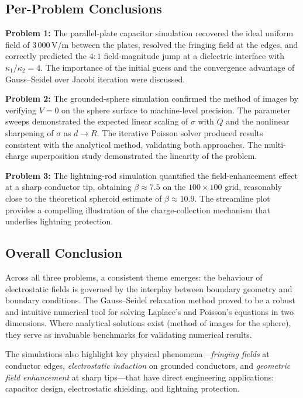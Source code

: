 \documentclass[11pt,a4paper]{article}
\begin{document}
\subsection{Per-Problem Conclusions}

\textbf{Problem 1:} The parallel-plate capacitor simulation recovered the ideal uniform field of 3\,000\,V/m between the plates, resolved the fringing field at the edges, and correctly predicted the $4{:}1$ field-magnitude jump at a dielectric interface with $\kappa_1/\kappa_2 = 4$. The importance of the initial guess and the convergence advantage of Gauss--Seidel over Jacobi iteration were discussed.

\textbf{Problem 2:} The grounded-sphere simulation confirmed the method of images by verifying $V=0$ on the sphere surface to machine-level precision. The parameter sweeps demonstrated the expected linear scaling of $\sigma$ with $Q$ and the nonlinear sharpening of $\sigma$ as $d \to R$. The iterative Poisson solver produced results consistent with the analytical method, validating both approaches. The multi-charge superposition study demonstrated the linearity of the problem.

\textbf{Problem 3:} The lightning-rod simulation quantified the field-enhancement effect at a sharp conductor tip, obtaining $\beta \approx 7.5$ on the $100 \times 100$ grid, reasonably close to the theoretical spheroid estimate of $\beta \approx 10.9$. The streamline plot provides a compelling illustration of the charge-collection mechanism that underlies lightning protection.

\subsection{Overall Conclusion}

Across all three problems, a consistent theme emerges: the behaviour of electrostatic fields is governed by the interplay between boundary geometry and boundary conditions. The Gauss--Seidel relaxation method proved to be a robust and intuitive numerical tool for solving Laplace's and Poisson's equations in two dimensions. Where analytical solutions exist (method of images for the sphere), they serve as invaluable benchmarks for validating numerical results.

The simulations also highlight key physical phenomena---\emph{fringing fields} at conductor edges, \emph{electrostatic induction} on grounded conductors, and \emph{geometric field enhancement} at sharp tips---that have direct engineering applications: capacitor design, electrostatic shielding, and lightning protection.
\end{document}
